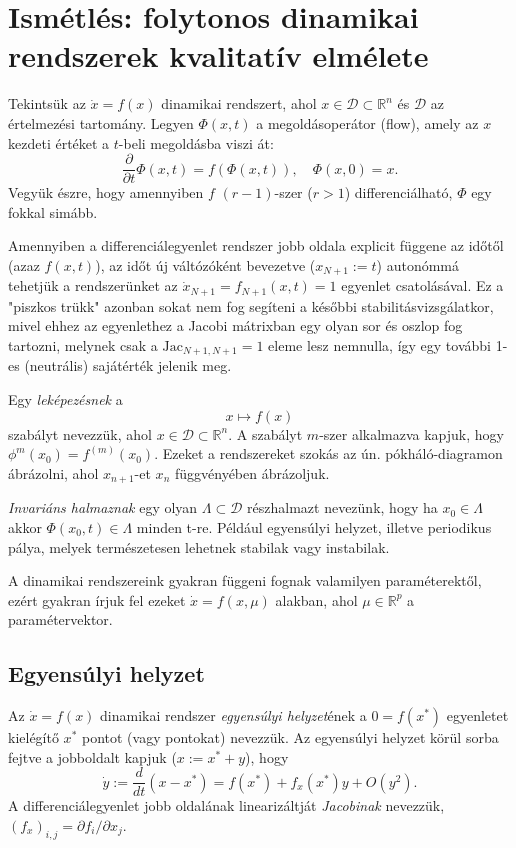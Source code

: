 \chapter{Ismétlés: folytonos dinamikai rendszerek kvalitatív elmélete}

Tekintsük az $\dot{x}=f(x)$ dinamikai rendszert, ahol $x \in \mathcal{D} \subset \mathbb{R}^n$ és $\mathcal{D}$ az értelmezési tartomány. Legyen $\Phi(x,t)$ a megoldásoperátor (flow), amely az $x$ kezdeti értéket a $t$-beli megoldásba viszi át:
\[
\frac{\partial}{\partial t} \Phi(x,t)=f(\Phi(x,t)), \quad \Phi(x,0)=x.
\]
Vegyük észre, hogy amennyiben $f$ $(r-1)$-szer ($r>1$) differenciálható, $\Phi$ egy fokkal simább.

Amennyiben a differenciálegyenlet rendszer jobb oldala explicit függene az időtől (azaz $f(x,t)$), az időt új váltózóként bevezetve ($x_{N+1}:=t$) autonómmá tehetjük a rendszerünket az $\dot{x}_{N+1}=f_{N+1}(x,t)=1$ egyenlet csatolásával. Ez a "piszkos trükk" azonban sokat nem fog segíteni a későbbi stabilitásvizsgálatkor, mivel ehhez az egyenlethez a Jacobi mátrixban egy olyan sor és oszlop fog tartozni, melynek csak a $\mathrm{Jac}_{N+1,N+1}=1$ eleme lesz nemnulla, így egy további 1-es (neutrális) sajátérték jelenik meg.

Egy \emph{leképezésnek}  a
\[
x\mapsto f(x)
\]
szabályt nevezzük, ahol $x \in \mathcal{D} \subset \mathbb{R}^n$. A szabályt $m$-szer alkalmazva kapjuk, hogy $\phi^{m}(x_0)=f^{(m)}(x_0)$. Ezeket a rendszereket szokás az ún. pókháló-diagramon ábrázolni, ahol $x_{n+1}$-et $x_n$ függvényében ábrázoljuk.

\emph{Invariáns halmaznak} egy olyan $\Lambda \subset \mathcal{D}$ részhalmazt nevezünk, hogy ha $x_0 \in \Lambda$ akkor $\Phi(x_0,t) \in \Lambda$ minden t-re. Például egyensúlyi helyzet, illetve periodikus pálya, melyek természetesen lehetnek stabilak vagy instabilak.

A dinamikai rendszereink gyakran függeni fognak valamilyen paraméterektől, ezért gyakran írjuk fel ezeket $\dot{x}=f(x,\mu)$ alakban, ahol $\mu \in \mathbb{R}^p$ a paramétervektor.

\section{Egyensúlyi helyzet}

Az $\dot{x}=f(x)$ dinamikai rendszer \emph{egyensúlyi helyzet}ének a $0=f(x^*)$ egyenletet kielégítő $x^*$ pontot (vagy pontokat) nevezzük. Az egyensúlyi helyzet körül sorba fejtve a jobboldalt kapjuk ($x:=x^*+y$), hogy
\[
\dot y := \frac{d}{dt} (x-x^*) = f(x^*) +f_x(x^*)y + O(y^2).
\]
A differenciálegyenlet jobb oldalának linearizáltját \emph{Jacobinak} nevezzük, $(f_x)_{i,j}=\partial f_i/\partial x_j$.

